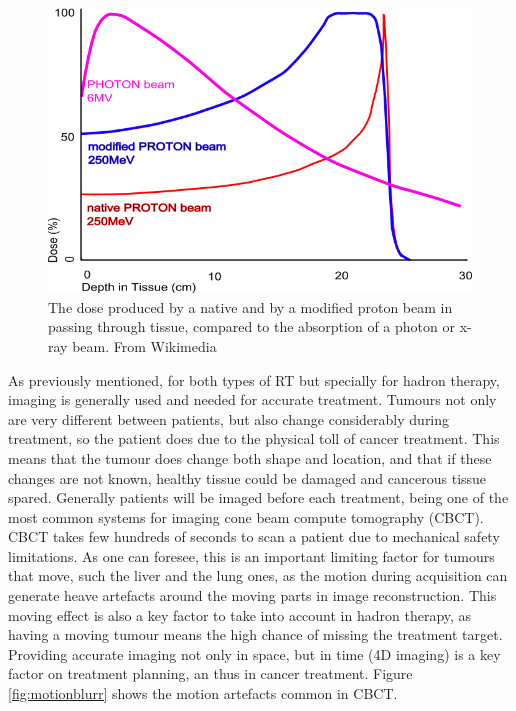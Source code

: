 \begin{figure}[ht]
\begin{center}
\includegraphics[width=0.6\columnwidth]{Introduction/BraggPeak.png}
\caption[Bragg peak]{The dose produced by a native and by a modified proton beam in passing through tissue, compared to the absorption of a photon or x-ray beam. From Wikimedia\cite{bragg}}
\label{fig:bragg}
\end{center}
\end{figure}


As previously mentioned, for both types of RT but specially for hadron therapy, imaging is generally used and needed for accurate treatment. Tumours not only are very different between patients, but also change considerably during treatment, so the patient does due to the physical toll of cancer treatment. This means that the tumour does change both shape and location, and that if these changes are not known, healthy tissue could be damaged and cancerous tissue spared. Generally patients will be imaged before each treatment, being one of the most common systems for imaging cone beam compute tomography (CBCT). CBCT takes few hundreds of seconds to scan a patient due to mechanical safety limitations. As one can foresee, this is an important limiting factor for tumours that move, such the liver and the lung ones, as the motion during acquisition can generate heave artefacts around the moving parts in image reconstruction. This moving effect is also a key factor to take into account in hadron therapy, as having a moving tumour means the high chance of missing the treatment target. Providing accurate imaging not only in space, but in time (4D imaging) is a key factor on treatment planning, an thus in cancer treatment. Figure \ref{fig:motionblurr} shows the motion artefacts common in CBCT.

